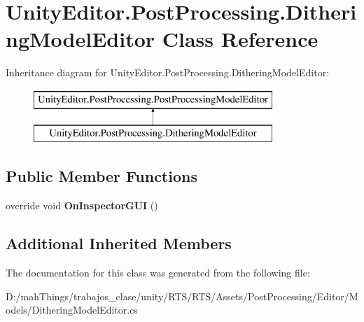\hypertarget{class_unity_editor_1_1_post_processing_1_1_dithering_model_editor}{}\section{Unity\+Editor.\+Post\+Processing.\+Dithering\+Model\+Editor Class Reference}
\label{class_unity_editor_1_1_post_processing_1_1_dithering_model_editor}
Inheritance diagram for Unity\+Editor.\+Post\+Processing.\+Dithering\+Model\+Editor\+:\begin{figure}[H]
\begin{center}
\leavevmode
\includegraphics[height=2.000000cm]{class_unity_editor_1_1_post_processing_1_1_dithering_model_editor}
\end{center}
\end{figure}
\subsection*{Public Member Functions}
\begin{DoxyCompactItemize}
\item 
\mbox{\label{class_unity_editor_1_1_post_processing_1_1_dithering_model_editor_a32cce7225dccf96fea7c0d1bc9ff8384}} 
override void {\bfseries On\+Inspector\+G\+UI} ()
\end{DoxyCompactItemize}
\subsection*{Additional Inherited Members}


The documentation for this class was generated from the following file\+:\begin{DoxyCompactItemize}
\item 
D\+:/mah\+Things/trabajos\+\_\+clase/unity/\+R\+T\+S/\+R\+T\+S/\+Assets/\+Post\+Processing/\+Editor/\+Models/Dithering\+Model\+Editor.\+cs\end{DoxyCompactItemize}

